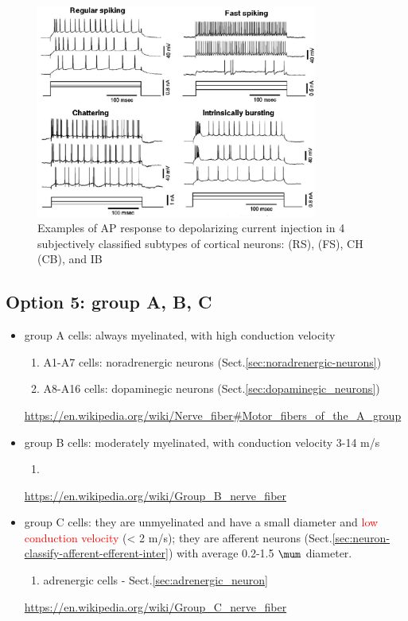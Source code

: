\begin{figure}[hbt]
  \centerline{\includegraphics[height=7cm,
    angle=0]{./images/neuron_APs.eps}}
\caption{Examples of AP response to depolarizing current injection in 4
subjectively classified subtypes of cortical neurons: (RS), (FS), CH (CB), and
IB}
\label{fig:neuron_APs}
\end{figure}

\subsection{Option 5: group A, B, C}
\label{sec:neuron-classify-group-A,B,C}

\begin{itemize}
  \item group A cells: always myelinated, with high conduction velocity
  
  \begin{enumerate}
    \item A1-A7 cells: noradrenergic neurons (Sect.\ref{sec:noradrenergic-neurons})
    \item A8-A16 cells: dopaminegic neurons (Sect.\ref{sec:dopaminegic_neurons})
  \end{enumerate}
  \url{https://en.wikipedia.org/wiki/Nerve_fiber#Motor_fibers_of_the_A_group}
  
  \item group B cells: moderately myelinated, with conduction velocity 3-14 m/s
  \begin{enumerate}
    \item 
  \end{enumerate}
  \url{https://en.wikipedia.org/wiki/Group_B_nerve_fiber}
  
  \item group C cells: they are unmyelinated and have a small diameter and
  \textcolor{red}{low conduction velocity} (< 2 m/s); they are afferent neurons
  (Sect.\ref{sec:neuron-classify-afferent-efferent-inter})
  with average 0.2-1.5 $\mum$ diameter.
  
  \begin{enumerate}
    \item adrenergic cells - Sect.\ref{sec:adrenergic_neuron}
  \end{enumerate}
  \url{https://en.wikipedia.org/wiki/Group_C_nerve_fiber}
\end{itemize}


